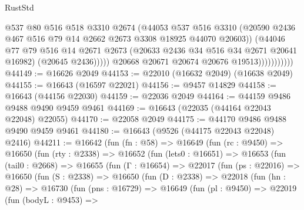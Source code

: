 \begin{lexlean}{RustStd}
\begin{coremodule}
                                @537
                                @80
                                @516
                                @518
                                @3310
                                @2674
                                (@44053
                                  @537
                                  @516
                                  @3310
                                  (@20590
                                    @2436
                                    @467
                                    @516
                                    @79
                                    @14
                                    @2662
                                    @2673
                                    @3308
                                    @18925
                                    @44070
                                    @20603))
                                (@44046
                                  @77
                                  @79
                                  @516
                                  @14
                                  @2671
                                  @2673
                                  (@20633 @2436 @34 @516 @34 @2671 @20641 @16982)
                                  (@20645 @2436)))))
                          @20668
                          @20671
                          @20674
                          @20676
                          @19513)))))))))))
@44149 := @16626 @2049
@44153 := @22010 (@16632 @2049) (@16638 @2049)
@44155 := @16643 (@16597 @22021)
@44156 := @9457 @14829
@44158 := @16643 (@44156 @22030)
@44159 := @22036 @2049
@44164 := @44159 @9486 @9488 @9490 @9459 @9461
@44169 := @16643 (@22035 (@44164 @22043 @22048) @22055)
@44170 := @22058 @2049
@44175 := @44170 @9486 @9488 @9490 @9459 @9461
@44180 := @16643 (@9526 (@44175 @22043 @22048) @2416)
@44211 := @16642
    (fun (fn : @58) =>
    @16649
      (fun (rc : @9450) =>
      @16650
        (fun (rty : @2338) =>
        @16652
          (fun (lets0 : @16651) =>
          @16653
            (fun (tail0 : @2668) =>
            @16655
              (fun (Γ : @16654) =>
              @22017
                (fun (ps : @22016) =>
                @16650
                  (fun (S : @2338) =>
                  @16650
                    (fun (D : @2338) =>
                    @22018
                      (fun (hn : @28) =>
                      @16730
                        (fun (pns : @16729) =>
                        @16649
                          (fun (pl : @9450) =>
                          @22019
                            (fun (bodyL : @9453) =>

\end{coremodule}
\end{lexlean}
